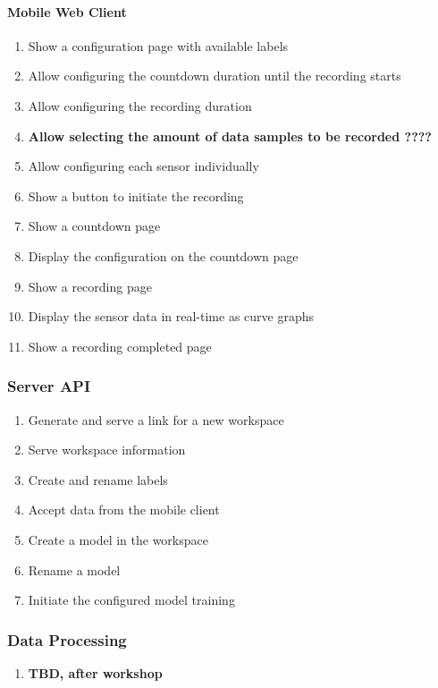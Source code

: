 \paragraph{Mobile Web Client}
\begin{enumerate}[resume*]
    \item Show a configuration page with available labels
    \item Allow configuring the countdown duration until the recording starts
    \item Allow configuring the recording duration
    \item \textbf{Allow selecting the amount of data samples to be recorded ????} %
    \item Allow configuring each sensor individually
    \item Show a button to initiate the recording
    \item Show a countdown page
    \item Display the configuration on the countdown page
    \item Show a recording page
    \item Display the sensor data in real-time as curve graphs
    \item Show a recording completed page %
\end{enumerate}

\subsubsection{Server API}
\begin{enumerate}[resume*]
    \item Generate and serve a link for a new workspace
    \item Serve workspace information
    \item Create and rename labels
    \item Accept data from the mobile client
    \item Create a model in the workspace
    \item Rename a model
    \item Initiate the configured model training
\end{enumerate}

\subsubsection{Data Processing}
\begin{enumerate}[resume*]
    \item \textbf{TBD, after workshop}
\end{enumerate}

